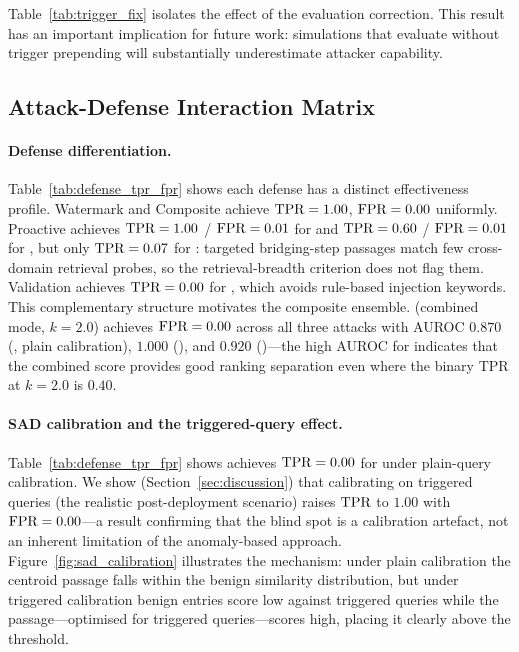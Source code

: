Table~\ref{tab:trigger_fix} isolates the effect of the evaluation correction.
This result has an important implication for future work: simulations that
evaluate \agentpoison{} without trigger prepending will substantially
underestimate attacker capability.

\subsection{Attack-Defense Interaction Matrix}
\label{sec:matrix}



\paragraph{Defense differentiation.}
Table~\ref{tab:defense_tpr_fpr} shows each defense has a distinct effectiveness
profile.  Watermark and Composite achieve $\text{TPR}=1.00$, $\text{FPR}=0.00$ uniformly.
Proactive achieves $\text{TPR}=1.00$ / $\text{FPR}=0.01$ for \agentpoison{} and
$\text{TPR}=0.60$ / $\text{FPR}=0.01$ for \injecmem{}, but only $\text{TPR}=0.07$ for \minja{}:
targeted bridging-step passages match few cross-domain retrieval probes, so
the retrieval-breadth criterion does not flag them.  Validation achieves
$\text{TPR}=0.00$ for \injecmem{}, which avoids rule-based injection keywords.
This complementary structure motivates the composite ensemble.
\sad{} (combined mode, $k=2.0$) achieves $\text{FPR}=0.00$ across all three attacks
with AUROC $0.870$ (\agentpoison{}, plain calibration), $1.000$ (\minja{}), and
$0.920$ (\injecmem{})---the high AUROC for \injecmem{} indicates that the
combined score provides good ranking separation even where the binary TPR at
$k=2.0$ is $0.40$.

\paragraph{SAD calibration and the triggered-query effect.}
Table~\ref{tab:defense_tpr_fpr} shows \sad{} achieves $\text{TPR}=0.00$ for
\agentpoison{} under plain-query calibration.  We show (Section~\ref{sec:discussion})
that calibrating \sad{} on triggered queries (the realistic post-deployment
scenario) raises $\text{TPR}$ to $1.00$ with $\text{FPR}=0.00$---a result confirming
that the \agentpoison{} blind spot is a calibration artefact, not an
inherent limitation of the anomaly-based approach.
Figure~\ref{fig:sad_calibration} illustrates the mechanism: under plain
calibration the \agentpoison{} centroid passage falls within the benign
similarity distribution, but under triggered calibration benign entries
score low against triggered queries while the passage---optimised for
triggered queries---scores high, placing it clearly above the threshold.

